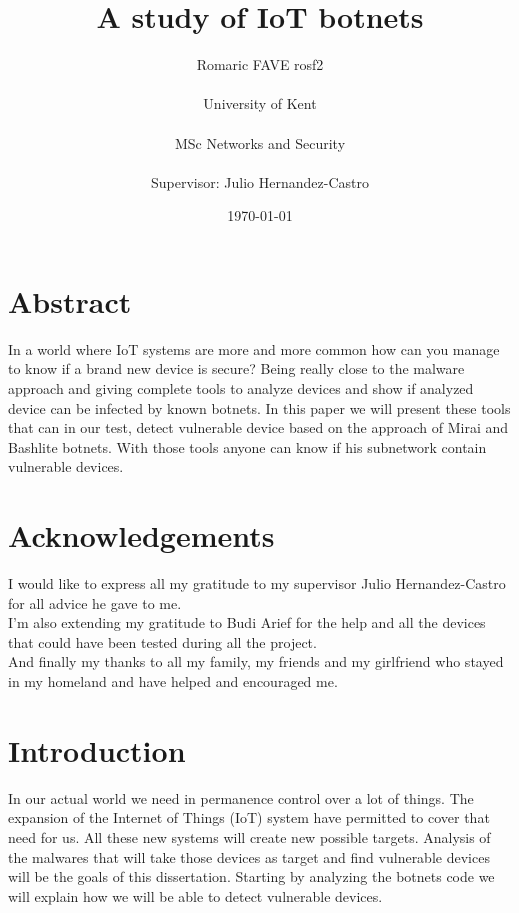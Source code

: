\documentclass{report}
\date{\monthyeardate\today}
\begin{document}
\title{A study of IoT botnets}
\author{Romaric FAVE rosf2\\
  \\
  University of Kent\\
  \\
  MSc Networks and Security\\
  \\
  Supervisor: Julio Hernandez-Castro
}

\maketitle

\tableofcontents

\chapter*{Abstract}
In a world where IoT systems are more and more common how can you manage to know if a brand new device is secure? Being really close to the malware approach and giving complete tools to analyze devices and show if analyzed device can be infected by known botnets. In this paper we will present these tools that can in our test, detect vulnerable device based on the approach of Mirai and Bashlite botnets. With those tools anyone can know if his subnetwork contain vulnerable devices.

\chapter*{Acknowledgements}
I would like to express all my gratitude to my supervisor Julio Hernandez-Castro for all advice he gave to me.\\
I'm also extending my gratitude to Budi Arief for the help and all the devices that could have been tested during all the project.\\
And finally my thanks to all my family, my friends and my girlfriend who stayed in my homeland and have helped and encouraged me.

\chapter{Introduction}
In our actual world we need in permanence control over a lot of things. The expansion of the Internet of Things (IoT) system have permitted to cover that need for us. All these new systems will create new possible targets. Analysis of the malwares that will take those devices as target and find vulnerable devices will be the goals of this dissertation.\newline
Starting by analyzing the botnets code we will explain how we will be able to detect vulnerable devices.
\end{document}
